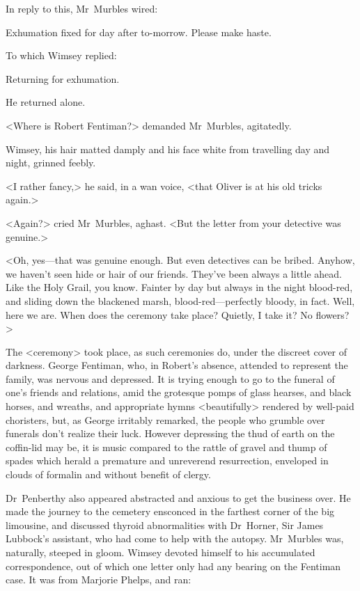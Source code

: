 In reply to this, Mr~Murbles wired: \begin{telegram}Exhumation fixed for day after to-morrow. Please make haste.\end{telegram}

To which Wimsey replied: \begin{telegram}[\acronym{PW}]Returning for exhumation.\end{telegram}

He returned alone.

<Where is Robert Fentiman?> demanded Mr~Murbles, agitatedly.

Wimsey, his hair matted damply and his face white from travelling day and night, grinned feebly.

<I rather fancy,> he said, in a wan voice, <that Oliver is at his old tricks again.>

<Again?> cried Mr~Murbles, aghast. <But the letter from your detective was genuine.>

<Oh, yes—that was genuine enough. But even detectives can be bribed. Anyhow, we haven't seen hide or hair of our friends. They've been always a little ahead. Like the Holy Grail, you know. Fainter by day but always in the night blood-red, and sliding down the blackened marsh, blood-red—perfectly bloody, in fact. Well, here we are. When does the ceremony take place? Quietly, I take it? No flowers?>

The <ceremony> took place, as such ceremonies do, under the discreet cover of darkness. George Fentiman, who, in Robert's absence, attended to represent the family, was nervous and depressed. It is trying enough to go to the funeral of one's friends and relations, amid the grotesque pomps of glass hearses, and black horses, and wreaths, and appropriate hymns <beautifully> rendered by well-paid choristers, but, as George irritably remarked, the people who grumble over funerals don't realize their luck. However depressing the thud of earth on the coffin-lid may be, it is music compared to the rattle of gravel and thump of spades which herald a premature and unreverend resurrection, enveloped in clouds of formalin and without benefit of clergy.

Dr~Penberthy also appeared abstracted and anxious to get the business over. He made the journey to the cemetery ensconced in the farthest corner of the big limousine, and discussed thyroid abnormalities with Dr~Horner, Sir James Lubbock's assistant, who had come to help with the autopsy. Mr~Murbles was, naturally, steeped in gloom. Wimsey devoted himself to his accumulated correspondence, out of which one letter only had any bearing on the Fentiman case. It was from Marjorie Phelps, and ran:

